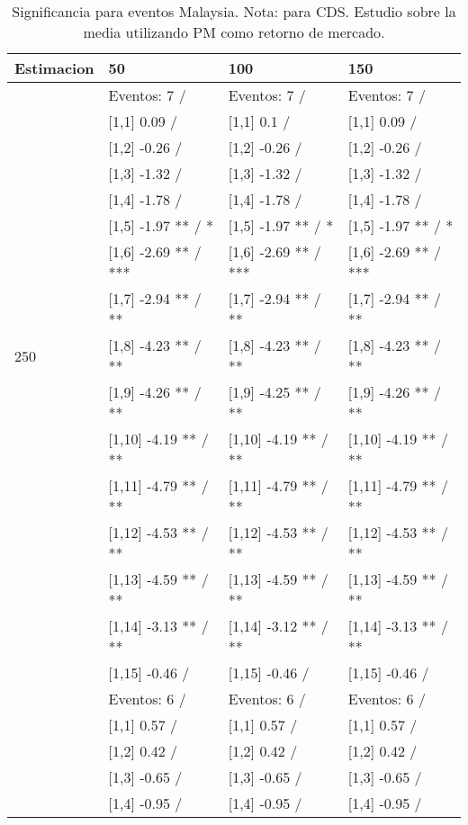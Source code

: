 \begin{table}

\caption{Significancia para eventos Malaysia. Nota: para CDS. Estudio sobre la media utilizando PM como retorno de mercado.}
\centering
\begin{tabular}[t]{llll}
\toprule
Estimacion & 50 & 100 & 150\\
\midrule
 & Eventos:  7 / & Eventos:  7 / & Eventos:  7 /\\
 & {}[1,1] 0.09  / & {}[1,1] 0.1  / & {}[1,1] 0.09  /\\
 & {}[1,2] -0.26  / & {}[1,2] -0.26  / & {}[1,2] -0.26  /\\
 & {}[1,3] -1.32  / & {}[1,3] -1.32  / & {}[1,3] -1.32  /\\
 & {}[1,4] -1.78  / & {}[1,4] -1.78  / & {}[1,4] -1.78  /\\
\addlinespace
 & {}[1,5] -1.97 ** / * & {}[1,5] -1.97 ** / * & {}[1,5] -1.97 ** / *\\
 & {}[1,6] -2.69 ** / *** & {}[1,6] -2.69 ** / *** & {}[1,6] -2.69 ** / ***\\
 & {}[1,7] -2.94 ** / ** & {}[1,7] -2.94 ** / ** & {}[1,7] -2.94 ** / **\\
250 & {}[1,8] -4.23 ** / ** & {}[1,8] -4.23 ** / ** & {}[1,8] -4.23 ** / **\\
 & {}[1,9] -4.26 ** / ** & {}[1,9] -4.25 ** / ** & {}[1,9] -4.26 ** / **\\
\addlinespace
 & {}[1,10] -4.19 ** / ** & {}[1,10] -4.19 ** / ** & {}[1,10] -4.19 ** / **\\
 & {}[1,11] -4.79 ** / ** & {}[1,11] -4.79 ** / ** & {}[1,11] -4.79 ** / **\\
 & {}[1,12] -4.53 ** / ** & {}[1,12] -4.53 ** / ** & {}[1,12] -4.53 ** / **\\
 & {}[1,13] -4.59 ** / ** & {}[1,13] -4.59 ** / ** & {}[1,13] -4.59 ** / **\\
 & {}[1,14] -3.13 ** / ** & {}[1,14] -3.12 ** / ** & {}[1,14] -3.13 ** / **\\
\addlinespace
 & {}[1,15] -0.46  / & {}[1,15] -0.46  / & {}[1,15] -0.46  /\\
 & Eventos:  6 / & Eventos:  6 / & Eventos:  6 /\\
 & {}[1,1] 0.57  / & {}[1,1] 0.57  / & {}[1,1] 0.57  /\\
 & {}[1,2] 0.42  / & {}[1,2] 0.42  / & {}[1,2] 0.42  /\\
 & {}[1,3] -0.65  / & {}[1,3] -0.65  / & {}[1,3] -0.65  /\\
\addlinespace
 & {}[1,4] -0.95  / & {}[1,4] -0.95  / & {}[1,4] -0.95  /\\

\end{tabular}
\end{table}
